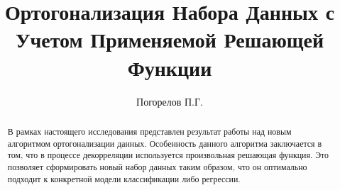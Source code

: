 \documentclass[runningheads]{llncs}
\begin{document}
%
\title{Ортогонализация Набора Данных с Учетом Применяемой Решающей Функции}
%
%
\author{Погорелов П.Г.}
%
%
%
\maketitle              %
%
\begin{abstract}
В рамках настоящего исследования представлен результат работы над новым алгоритмом ортогонализации данных. Особенность данного алгоритма заключается в том, что в процессе декорреляции используется произвольная решающая функция. Это позволяет сформировать новый набор данных таким образом, что он оптимально подходит к конкретной модели классификации либо регрессии.

\end{abstract}
%
%
%
\end{document}

